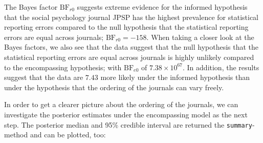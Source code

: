 \documentclass[
  english,
  man,floatsintext]{apa6}
\newenvironment{Shaded}{\begin{snugshade}}{\end{snugshade}}
\newcommand{\NormalTok}[1]{#1}
\newcommand{\OperatorTok}[1]{\textcolor[rgb]{0.81,0.36,0.00}{\textbf{#1}}}
\newcommand{\StringTok}[1]{\textcolor[rgb]{0.31,0.60,0.02}{#1}}
\begin{document}
\begin{Shaded}
\end{Shaded}

The Bayes factor \(\text{BF}_{r0}\) suggests extreme evidence for the informed hypothesis that the social psychology journal JPSP has the highest prevalence for statistical reporting errors compared to the null hypothesis that the statistical reporting errors are equal across journals; \(\text{BF}_{r0} = -158\).
When taking a closer look at the Bayes factors, we also see that the data suggest that the null hypothesis that the statistical reporting errors are equal across journals is highly unlikely compared to the encompassing hypothesis; with \(\text{BF}_{e0}\) of \(7.38 \times 10^{67}\). In addition, the results suggest that the data are \(7.43\) more likely under the informed hypothesis than under the hypothesis that the ordering of the journals can vary freely.

In order to get a clearer picture about the ordering of the journals, we can investigate the posterior estimates
under the encompassing model as the next step. The posterior median and 95\% credible interval are returned the \texttt{summary}-method and can be plotted, too:
\end{document}
